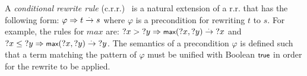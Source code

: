 A \emph{conditional rewrite rule} (c.r.r.)~\cite{jcss/Bergstra} is a natural extension of a r.r. that has the following form:
$\varphi \Rightarrow t \overset{.\,}{\rightarrow} s$
where $\varphi$ is a precondition for rewriting $t$ to $s$. For example, the rules for $max$ are:
${?x} > {?y} \Rightarrow \tmax({?x}, {?y}) \rwto {?x}$ and 
${?x} \leq {?y} \Rightarrow \tmax({?x}, {?y}) \rwto {?y}$.
%
The semantics of a precondition $\varphi$ is defined such that a term matching the pattern of $\varphi$
must be unified with Boolean $\ttrue$ in order for the rewrite to be applied.
